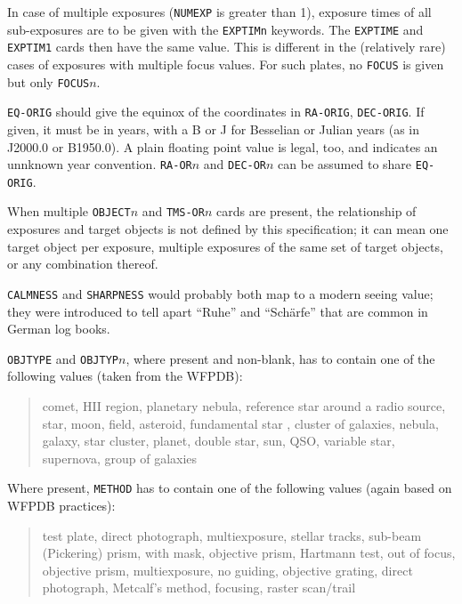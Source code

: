 \documentclass[11pt]{ivoa}
\newcommand\cardname[1]{\texttt{\color{keyword}#1}}
\begin{document}
In case of multiple exposures (\cardname{NUMEXP} is greater than 1),
exposure times of all sub-exposures are to be given with the
\cardname{EXPTIMn} keywords.  The \cardname{EXPTIME} and
\cardname{EXPTIM1} cards then have the same value.  This is different in
the (relatively rare) cases of exposures with multiple focus values.
For such plates, no \cardname{FOCUS} is given but only
\cardname{FOCUS$n$}.

\cardname{EQ-ORIG} should give the equinox of the coordinates in
\cardname{RA-ORIG}, \cardname{DEC-ORIG}.  If given, it must be in
years, with a B or J for Besselian or Julian years (as in J2000.0 or
B1950.0).  A plain floating point value is legal, too, and indicates
an unnknown year convention.  \cardname{RA-OR$n$} and
\cardname{DEC-OR$n$} can be assumed to share \cardname{EQ-ORIG}.

When multiple \cardname{OBJECT$n$} and \cardname{TMS-OR$n$} cards are
present, the relationship of exposures and target objects is not defined
by this specification; it can mean one target object per exposure,
multiple exposures of the same set of target objects, or any combination
thereof.

\cardname{CALMNESS} and \cardname{SHARPNESS} would probably both map to
a modern seeing value; they were introduced to tell apart ``Ruhe'' and
``Schärfe'' that are common in German log books.

\cardname{OBJTYPE} and \cardname{OBJTYP$n$}, where present and
non-blank, has to contain one of the following values (taken from the
WFPDB):

\begin{quotation}
\noindent comet, HII region, planetary nebula, reference star around a radio
source, star, moon, field, asteroid, fundamental star
, cluster of galaxies, nebula, galaxy, star cluster, planet, double
star, sun, QSO, variable star, supernova, group of galaxies
\end{quotation}

Where present, \cardname{METHOD} has to contain one of the following
values (again based on WFPDB practices):

\begin{quotation}
\noindent test plate, direct photograph, multiexposure, stellar tracks, sub-beam
(Pickering) prism, with mask, objective prism, Hartmann test, out of
focus, objective prism, multiexposure, no guiding, objective grating,
direct photograph, Metcalf's method, focusing, raster scan/trail
\end{quotation}
\end{document}
